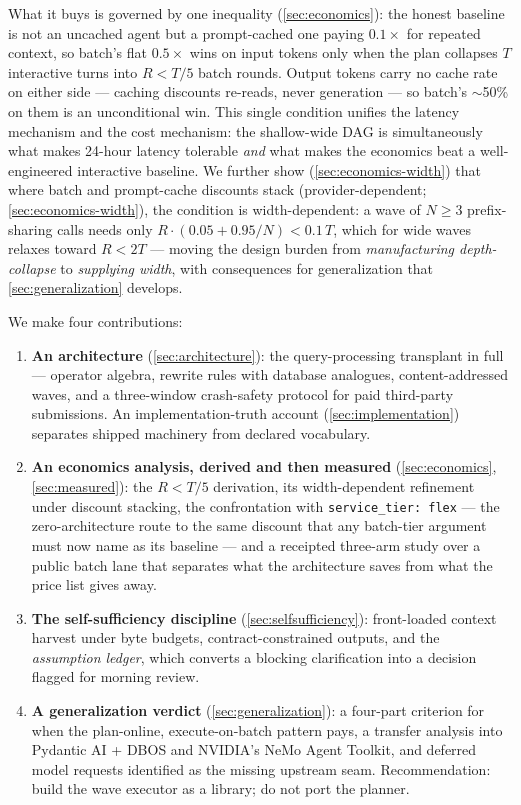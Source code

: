 \documentclass[11pt]{article}
\begin{document}
What it buys is governed by one inequality (\cref{sec:economics}): the honest baseline is not an uncached agent but a prompt-cached one paying $0.1\times$ for repeated context, so batch's flat $0.5\times$ wins on input tokens only when the plan collapses $T$ interactive turns into $R < T/5$ batch rounds. Output tokens carry no cache rate on either side --- caching discounts re-reads, never generation --- so batch's $\sim$50\% on them is an unconditional win. This single condition unifies the latency mechanism and the cost mechanism: the shallow-wide DAG is simultaneously what makes 24-hour latency tolerable \emph{and} what makes the economics beat a well-engineered interactive baseline. We further show (\cref{sec:economics-width}) that where batch and prompt-cache discounts stack (provider-dependent; \cref{sec:economics-width}), the condition is width-dependent: a wave of $N \ge 3$ prefix-sharing calls needs only $R \cdot (0.05 + 0.95/N) < 0.1\,T$, which for wide waves relaxes toward $R < 2T$ --- moving the design burden from \emph{manufacturing depth-collapse} to \emph{supplying width}, with consequences for generalization that \cref{sec:generalization} develops.

We make four contributions:
\begin{enumerate}
\item \textbf{An architecture} (\cref{sec:architecture}): the query-processing transplant in full --- operator algebra, rewrite rules with database analogues, content-addressed waves, and a three-window crash-safety protocol for paid third-party submissions. An implementation-truth account (\cref{sec:implementation}) separates shipped machinery from declared vocabulary.
\item \textbf{An economics analysis, derived and then measured} (\cref{sec:economics}, \cref{sec:measured}): the $R<T/5$ derivation, its width-dependent refinement under discount stacking, the confrontation with \texttt{service\_tier:\,flex} --- the zero-architecture route to the same discount that any batch-tier argument must now name as its baseline --- and a receipted three-arm study over a public batch lane that separates what the architecture saves from what the price list gives away.
\item \textbf{The self-sufficiency discipline} (\cref{sec:selfsufficiency}): front-loaded context harvest under byte budgets, contract-constrained outputs, and the \emph{assumption ledger}, which converts a blocking clarification into a decision flagged for morning review.
\item \textbf{A generalization verdict} (\cref{sec:generalization}): a four-part criterion for when the plan-online, execute-on-batch pattern pays, a transfer analysis into Pydantic AI + DBOS and NVIDIA's NeMo Agent Toolkit, and deferred model requests identified as the missing upstream seam. Recommendation: build the wave executor as a library; do not port the planner.
\end{enumerate}
\end{document}
